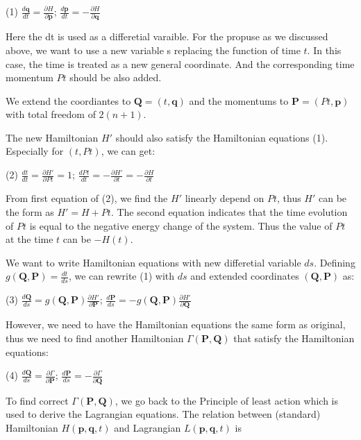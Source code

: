 (1) $ \frac{d \mathbf{q}}{d t} = \frac{\partial H}{\partial \mathbf{p}}$; $ \frac{d \mathbf{p}}{d t} = - \frac{\partial H}{\partial \mathbf{q}} $

Here the dt is used as a differetial varaible. For the propuse as we discussed above, we want to use a new variable s replacing the function of time $t$. In this case, the time is treated as a new general coordinate. And the corresponding time momentum $Pt$ should be also added.

We extend the coordiantes to $ \mathbf{Q} = (t, \mathbf{q}) $ and the momentums to $ \mathbf{P} = (Pt, \mathbf{p})$ with total freedom of $2(n+1)$.

The new Hamiltonian $H'$ should also satisfy the Hamiltonian equations (1). Especially for $(t, Pt)$, we can get\+:

(2) $ \frac{d t}{d t} = \frac{\partial H'}{\partial Pt} = 1 $; $ \frac{d Pt}{d t} = - \frac{\partial H'}{\partial t} = - \frac{\partial H}{\partial t}$

From first equation of (2), we find the $H'$ linearly depend on $Pt$, thus $H'$ can be the form as $ H' = H + Pt $. The second equation indicates that the time evolution of $Pt$ is equal to the negative energy change of the system. Thus the value of $Pt$ at the time $t$ can be $-H(t)$.

We want to write Hamiltonian equations with new differetial variable $ ds$. Defining $ g(\mathbf{Q},\mathbf{P}) = \frac{dt}{ds} $, we can rewrite (1) with $ds$ and extended coordinates $(\mathbf{Q}, \mathbf{P})$ as\+:

(3) $ \frac{d \mathbf{Q}}{d s} = g(\mathbf{Q},\mathbf{P}) \frac{\partial H'}{\partial \mathbf{P}} $; $ \frac{d \mathbf{P}}{d s} = - g(\mathbf{Q},\mathbf{P}) \frac{\partial H'}{\partial \mathbf{Q}} $

However, we need to have the Hamiltonian equations the same form as original, thus we need to find another Hamiltonian $\Gamma(\mathbf{P},\mathbf{Q})$ that satisfy the Hamiltonian equations\+:

(4) $ \frac{d \mathbf{Q}}{d s} = \frac{\partial \Gamma}{\partial \mathbf{P}} $; $ \frac{d \mathbf{P}}{d s} = -\frac{\partial \Gamma}{\partial \mathbf{Q}} $

To find correct $\Gamma(\mathbf{P},\mathbf{Q})$, we go back to the Principle of least action which is used to derive the Lagrangian equations. The relation between (standard) Hamiltonian $H(\mathbf{p},\mathbf{q},t)$ and Lagrangian $L(\mathbf{p},\mathbf{q},t)$ is

